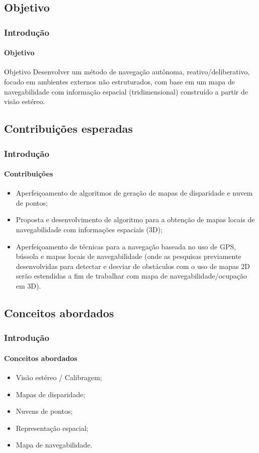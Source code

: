 \documentclass[brazil]{beamer}
\begin{document}
\subsection[Objetivo]{Objetivo}

\begin{frame}
\frametitle{Introdução}
\framesubtitle{Objetivo}
\begin{block}{Objetivo}
Desenvolver um método de navegação autônoma, reativo/deliberativo, focado em
ambientes externos não estruturados, com base em um mapa de navegabilidade com informação
espacial (tridimensional) construído a partir de visão estéreo.
\end{block}
\end{frame}

\subsection[Contribuições]{Contribuições esperadas}

\begin{frame}
\frametitle{Introdução}
\framesubtitle{Contribuições}
\begin{itemize}
\item Aperfeiçoamento de algoritmos de geração de mapas de disparidade e nuvem de pontos;
\item Proposta e desenvolvimento de algoritmo para a obtenção de mapas locais de 
navegabilidade com informações espaciais (3D);
\item Aperfeiçoamento de técnicas para a navegação baseada no uso de GPS, 
bússola e mapas locais de navegabilidade (onde as pesquisas previamente 
desenvolvidas para detectar e desviar de obstáculos com o uso de mapas 2D 
serão estendidas a fim de trabalhar com mapa de navegabilidade/ocupação em 3D).
\end{itemize}
\end{frame}


\subsection[Conceitos]{Conceitos abordados}

\begin{frame}
\frametitle{Introdução}
\framesubtitle{Conceitos abordados}
\begin{itemize}
\item Visão estéreo / Calibragem;
\item Mapas de disparidade;
\item Nuvens de pontos;
\item Representação espacial;
\item Mapa de navegabilidade.
\end{itemize}
\end{frame}
\end{document}
